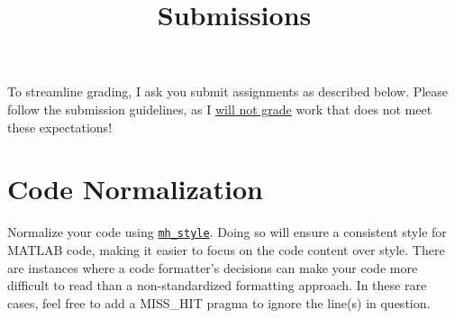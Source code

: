 \documentclass{article}
\title{Submissions}
\begin{document}
\renderTitle

\noindent
To streamline grading, I ask you submit assignments as described below.
Please follow the submission guidelines, as I \underline{will not grade}
work that does not meet these expectations!

\section{Code Normalization}

Normalize your code using \href{https://florianschanda.github.io/%
miss_hit/style_checker.html}{\texttt{mh\_style}}.  Doing so will ensure
a consistent style for MATLAB code, making it easier to focus on the
code content over style.  There are instances where a code formatter's
decisions can make your code more difficult to read than a
non-standardized formatting approach.  In these rare cases, feel free to
add a MISS\_HIT pragma to ignore the line(s) in question.
\end{document}
